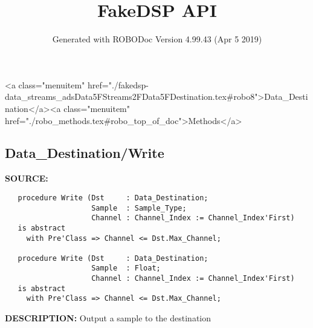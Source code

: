 \documentclass{article}
\title{FakeDSP API}
\author{Generated with ROBODoc Version 4.99.43 (Apr  5 2019)
}
\begin{document}
\maketitle
\printindex
\tableofcontents
\newpage

<a class="menuitem" href="./fakedsp-data_streams_adsData5FStreams2FData5FDestination.tex#robo8">Data_Destination</a><a class="menuitem" href="./robo_methods.tex#robo_top_of_doc">Methods</a>\subsection{Data\_Destination/Write}
\textbf{SOURCE:}\hspace{0.08in}\begin{verbatim}
   procedure Write (Dst     : Data_Destination;
                    Sample  : Sample_Type;
                    Channel : Channel_Index := Channel_Index'First)
   is abstract
     with Pre'Class => Channel <= Dst.Max_Channel;

   procedure Write (Dst     : Data_Destination;
                    Sample  : Float;
                    Channel : Channel_Index := Channel_Index'First)
   is abstract
     with Pre'Class => Channel <= Dst.Max_Channel;
\end{verbatim}
\textbf{DESCRIPTION:}\hspace{0.08in}
    Output a sample to the destination
\end{document}
